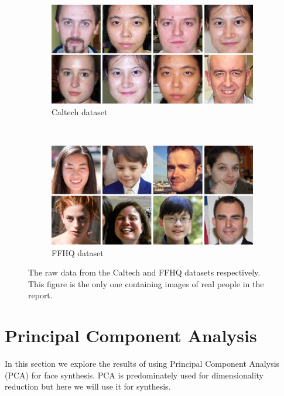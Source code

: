 \begin{figure}[h!]
    \centering
    \begin{subfigure}[b]{0.45\textwidth}
        \includegraphics[width=\textwidth]{fig/data/caltech}
        \caption{Caltech dataset}
        \label{raw-caltech}
    \end{subfigure}
    ~
    \begin{subfigure}[b]{0.45\textwidth}
        \includegraphics[width=\textwidth]{fig/data/ffhq}
        \caption{FFHQ dataset}
        \label{raw-ffhq}
    \end{subfigure}

    \caption{The raw data from the Caltech and FFHQ datasets respectively. This figure is the only one containing images of real people in the report.}
    \label{rawdata}
\end{figure}


\section{Principal Component Analysis }
In this section we explore the results of using Principal Component Analysis (PCA) for face synthesis. PCA is predominately used for dimensionality reduction but here we will use it for synthesis.

